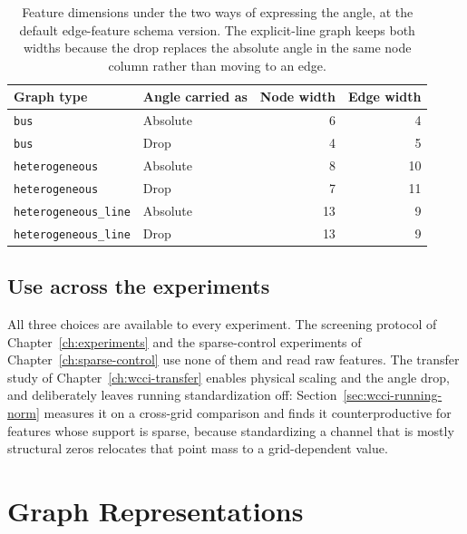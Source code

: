 \begin{table}[H]
  \centering
  \small
  \caption{Feature dimensions under the two ways of expressing the angle, at the
  default edge-feature schema version. The explicit-line graph keeps both widths
  because the drop replaces the absolute angle in the same node column rather
  than moving to an edge.}
  \label{tab:angle-feature-dims}
  \setlength{\tabcolsep}{8pt}
  \begin{tabular}{llrr}
    \toprule
    Graph type & Angle carried as & Node width & Edge width \\
    \midrule
    \texttt{bus} & Absolute & 6 & 4 \\
    \texttt{bus} & Drop & 4 & 5 \\
    \texttt{heterogeneous} & Absolute & 8 & 10 \\
    \texttt{heterogeneous} & Drop & 7 & 11 \\
    \texttt{heterogeneous\_line} & Absolute & 13 & 9 \\
    \texttt{heterogeneous\_line} & Drop & 13 & 9 \\
    \bottomrule
  \end{tabular}
\end{table}

\subsection{Use across the experiments}

All three choices are available to every experiment. The screening protocol of
Chapter~\ref{ch:experiments} and the sparse-control experiments of
Chapter~\ref{ch:sparse-control} use none of them and read raw features. The
transfer study of Chapter~\ref{ch:wcci-transfer} enables physical scaling and
the angle drop, and deliberately leaves running standardization off:
Section~\ref{sec:wcci-running-norm} measures it on a cross-grid comparison and
finds it counterproductive for features whose support is sparse, because
standardizing a channel that is mostly structural zeros relocates that point
mass to a grid-dependent value.


\section{Graph Representations}
\label{sec:graph-representation}

